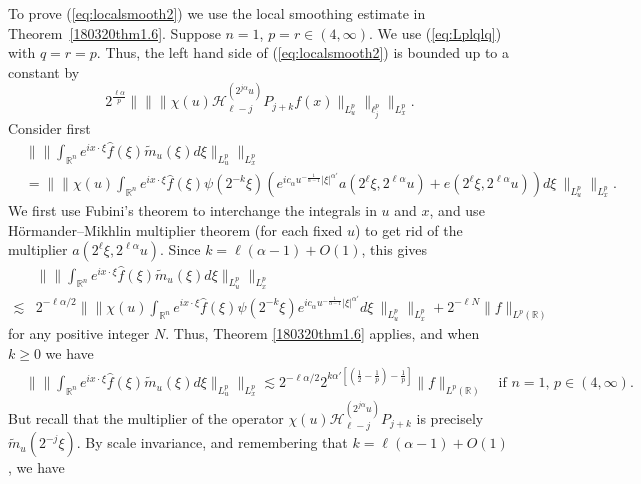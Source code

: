 \documentclass[12pt,leqno]{amsart}
\def\R{\mathbb{R}}
\theoremstyle{plain}
\numberwithin{equation}{section}
\begin{document}
To prove (\ref{eq:localsmooth2}) we use the local smoothing estimate in Theorem~\ref{180320thm1.6}. Suppose $n = 1$, $p = r \in (4,\infty)$. We use (\ref{eq:Lplqlq}) with $q = r = p$. Thus, the left hand side of (\ref{eq:localsmooth2}) is bounded up to a constant by
\begin{equation} \label{eq:0711}
2^{\frac{\ell \alpha}{p}} \| \| \| \chi(u) \mathcal{H}^{(2^{j \alpha} u)}_{\ell-j} P_{j+k} f (x)  \|_{L^p_u} \|_{\ell^p_j} \|_{L^p_x}.
\end{equation}
Consider first
\[
\begin{split}
&\| \| \int_{\R^n}  e^{i x \cdot \xi} \widehat{f}(\xi)  \tilde{m}_u(\xi)  d\xi  \|_{L^p_u}  \|_{L^p_x} \\
&=\| \| \chi(u) \int_{\R^n} e^{i x \cdot \xi} \widehat{f}(\xi) \psi(2^{-k} \xi) \left( e^{i c_{\alpha} u^{-\frac{1}{\alpha-1}} |\xi|^{\alpha'}} a(2^{\ell} \xi, 2^{\ell \alpha} u) + 
e(2^{\ell} \xi, 2^{\ell \alpha} u) \right) d\xi \ \|_{L^p_u}  \|_{L^p_x}.
\end{split}
\]
We first use Fubini's theorem to interchange the integrals in $u$ and $x$, and use H\"ormander--Mikhlin multiplier theorem (for each fixed $u$) to get rid of the multiplier $a(2^{\ell} \xi, 2^{\ell \alpha} u)$. Since $k = \ell(\alpha-1)+O(1)$, this gives
\[
\begin{split}
&\| \| \int_{\R^n}  e^{i x \cdot \xi} \widehat{f}(\xi)  \tilde{m}_u(\xi)  d\xi  \|_{L^p_u}  \|_{L^p_x} \\
\lesssim & 2^{-\ell \alpha / 2} \| \| \chi(u) \int_{\R^n}  e^{i x \cdot \xi} \widehat{f}(\xi) \psi(2^{-k} \xi) e^{i c_{\alpha} u^{-\frac{1}{\alpha-1}} |\xi|^{\alpha'}} d\xi \ \|_{L^p_u}  \|_{L^p_x} + 2^{-\ell N} \|f\|_{L^p(\R)}
\end{split}
\]
for any positive integer $N$.
Thus, Theorem \ref{180320thm1.6} applies, and when $k \geq 0$ we have
\[ 
\begin{split}
&  \| \| \int_{\R^n}  e^{i x \cdot \xi} \widehat{f}(\xi)  \tilde{m}_u(\xi)  d\xi  \|_{L^p_u}  \|_{L^p_x} \lesssim  2^{-\ell \alpha /2} 2^{k \alpha' \left[ \left(\frac{1}{2} - \frac{1}{p} \right) - \frac{1}{p} \right]} \|f\|_{L^p(\R)}  \quad \text{if $n = 1$, $p \in (4,\infty)$}.
\end{split}
\]
But recall that the multiplier of the operator $\chi(u) \mathcal{H}^{(2^{j \alpha} u)}_{\ell-j} P_{j+k}$ is precisely $\tilde{m}_u(2^{-j} \xi)$. By scale invariance, and remembering that $k = \ell(\alpha-1) + O(1)$, we have
\end{document}
